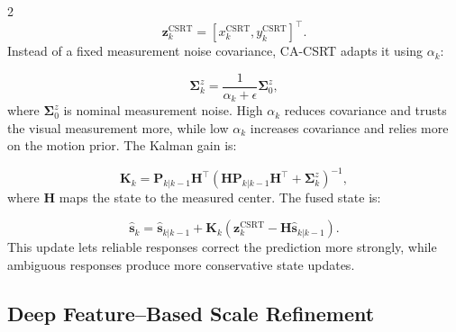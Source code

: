 \documentclass[10pt,a4paper]{article}
\begin{document}
\begin{multicols}{2}
\begin{equation}
\mathbf{z}_k^{\mathrm{CSRT}} =
[x_k^{\mathrm{CSRT}}, y_k^{\mathrm{CSRT}}]^{\top}.
\end{equation}
Instead of a fixed measurement noise covariance, CA-CSRT adapts it using $\alpha_k$:

\begin{equation}
\mathbf{\Sigma}^{z}_k =
\frac{1}{\alpha_k+\epsilon}\mathbf{\Sigma}^{z}_0,
\end{equation}
where $\mathbf{\Sigma}^{z}_0$ is nominal measurement noise. High $\alpha_k$ reduces covariance and trusts the visual measurement more, while low $\alpha_k$ increases covariance and relies more on the motion prior. The Kalman gain is:

\begin{equation}
\mathbf{K}_k =
\mathbf{P}_{k|k-1}\mathbf{H}^{\top}
(\mathbf{H}\mathbf{P}_{k|k-1}\mathbf{H}^{\top}
+ \mathbf{\Sigma}^{z}_k)^{-1},
\end{equation}
where $\mathbf{H}$ maps the state to the measured center. The fused state is:

\begin{equation}
\hat{\mathbf{s}}_k =
\hat{\mathbf{s}}_{k|k-1}
+ \mathbf{K}_k
(\mathbf{z}_k^{\mathrm{CSRT}} - \mathbf{H}\hat{\mathbf{s}}_{k|k-1}).
\end{equation}
This update lets reliable responses correct the prediction more strongly, while ambiguous responses produce more conservative state updates.

\subsection{Deep Feature--Based Scale Refinement}


\end{multicols}
\end{document}
